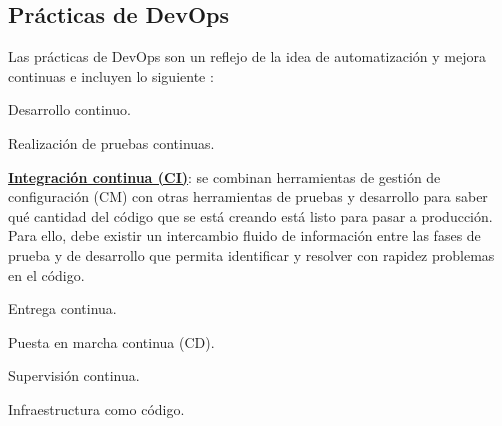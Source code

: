 \subsection{Prácticas de DevOps}
Las prácticas de DevOps son un reflejo de la idea de automatización y mejora continuas e incluyen lo siguiente \cite{netAppDevOps}:
\begin{compactitem}
    \item Desarrollo continuo.
    \item Realización de pruebas continuas.
    \item \textbf{\underline{Integración continua (CI)}}: se combinan herramientas de gestión de configuración (CM) con otras herramientas de pruebas y desarrollo para saber qué cantidad del código que se está creando está listo para pasar a producción. Para ello, debe existir un intercambio fluido de información entre las fases de prueba y de desarrollo que permita identificar y resolver con rapidez problemas en el código.
    \item Entrega continua.
    \item Puesta en marcha continua (CD).
    \item Supervisión continua.
    \item Infraestructura como código.
\end{compactitem}


